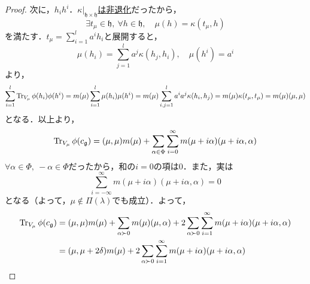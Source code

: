 \documentclass[rep_main]{subfiles}
\begin{document}
\begin{proof}
	次に，$h_ih^i$．\hyperref[col:torus-centralizer]{$\kappa|_{\mathfrak{h}\times\mathfrak{h}}$は非退化}だったから，
	\begin{equation}
		\exists t_\mu \in \mathfrak{h},\ \forall h \in \mathfrak{h},\quad  \mu(h) = \kappa(t_\mu, h)
	\end{equation}
	を満たす．$t_\mu = \sum_{i=1}^l a^ih_i$と展開すると，
	\begin{equation}
		\mu(h_i) = \sum_{j=1}^l a^j\kappa(h_j, h_i),\quad  \mu(h^i) = a^i
	\end{equation}
	より，
	\begin{equation}
		\sum_{i=1}^l\Tr_{V_\mu} \phi(h_i)\phi(h^i) = m(\mu)\sum_{i=1}^l\mu(h_i)\mu(h^i) = m(\mu)\sum_{i,j=1}^l a^ia^j\kappa(h_i, h_j) = m(\mu)\kappa(t_\mu, t_\mu) = m(\mu)(\mu, \mu)
	\end{equation}
	となる．以上より，
	\begin{equation}
		\Tr_{V_\mu} \phi(c_\mathfrak{g}) = (\mu, \mu)m(\mu) + \sum_{\alpha \in \Phi} \sum_{i=0}^\infty m(\mu + i\alpha)(\mu + i\alpha, \alpha)
	\end{equation}
	$\forall \alpha \in \Phi,\ -\alpha \in \Phi$だったから，和の$i = 0$の項は$0$．また，実は
	\begin{equation}
		\sum_{i=-\infty}^\infty m(\mu + i\alpha)(\mu + i\alpha, \alpha) = 0
	\end{equation}
	となる（よって，$\mu \notin \Pi(\lambda)$でも成立）．よって，
	\begin{align}
		\Tr_{V_\mu} \phi(c_\mathfrak{g}) &= (\mu, \mu)m(\mu) + \sum_{\alpha \succ 0} m(\mu)(\mu, \alpha) + 2\sum_{\alpha \succ 0} \sum_{i=1}^\infty m(\mu + i\alpha)(\mu + i\alpha, \alpha) \\
		&= (\mu, \mu + 2\delta)m(\mu) + 2\sum_{\alpha \succ 0} \sum_{i=1}^\infty m(\mu + i\alpha)(\mu + i\alpha, \alpha)
	\end{align}
\end{proof}
\end{document}
